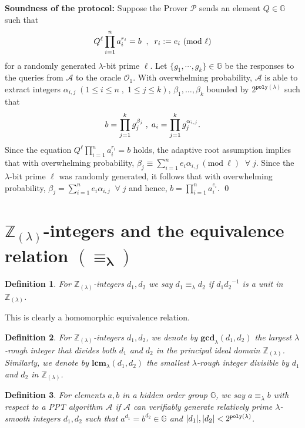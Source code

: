\documentclass[11pt, lettersize, notitlepage, leqno, footskip=0.6cm]{article}
\newcommand{\bz}{\mathbb Z}
\newcommand{\pl}{\prod\limits}
\newcommand{\slim}{\sum\limits}
\newcommand{\ttt}{\texttt}
\newcommand{\bG}{\mathbb{G}}
\newcommand{\LRA}{\Longleftrightarrow}
\newcommand{\eqlam}{\equiv_{\lam}}
\newcommand{\wti}{\widetilde}
\newcommand{\mc}{\mathcal}
\newcommand{\mb}{\mathbb}
\newcommand{\mbf}{\mathbf}
\newcommand{\al}{\alpha}
\newcommand{\be}{\beta}
\newcommand{\lam}{\lambda}
\newcommand{\lamb}{\lambda}
\newcommand{\bzlam}{\bz_{(\lam)}}
\newcommand{\mP}{\mc{P}}
\newcommand{\A}{\mc{A}}
\newcommand{\vs}{\vspace{-0.15cm}}
\newcommand{\noin}{\noindent}
\newcommand{\op}{overwhelming probability}
\newcommand{\Mod}[1]{\ (\mathrm{mod}\ #1)}
\newcommand{\LCM}{\mbf{lcm}}
\newcommand{\GCD}{\mbf{gcd}}
\newtheorem{Def}{Definition}[section]
\numberwithin{equation}{section}
\begin{document}
{{{\noin \textbf{Soundness of the protocol:} Suppose the Prover $\mP$ sends an element $Q\in\bG$ such that \vs $$Q^{\ell}\pl_{i=1}^n a_i^{r_i} = b\;\;,\;\;r_i:= e_i\Mod{\ell}\vs $$ for a randomly generated $\lam$-bit prime $\ell$. Let $\{g_1,\cdots,g_k\}\in \bG$ be the responses to the queries from $\A$ to the oracle $\mc{O}_1$. With \op, $\A$ is able to extract integers $\al_{i,j}\; (1\leq i \leq n\;,\;1\leq j \leq k)$, $\be_1,\dots, \be_k$ bounded by $2^{\ttt{poly}(\lam)}$ such that \vs $$b = \pl_{j=1}^k g_j^{\be_j}\;,\;a_i = \pl_{j=1}^k g_j^{\al_{i,j}}. \vspace{-0.25cm} $$ Since the equation $Q^{\ell}\prod_{i=1}^n a_i^{r_i} = b $ holds, the adaptive root assumption implies that with \op, $\be_j\equiv \sum_{i=1}^n e_i\al_{i, j}\Mod{\ell}\;\;\forall\; j.$ Since the $\lam$-bit prime $\ell$ was randomly generated, it follows that with \op, $ \be_j = \slim_{i=1}^n e_i\al_{i, j}\;\;\forall\; j$ and hence, $b = \prod_{i=1}^n a_i^{e_i}$. \qed

\section{\fontsize{11}{11}\selectfont $\bz_{(\lamb)}$-integers and the equivalence relation $\mathbf{(\equiv_{\lam})}$}


\begin{Def} For $\bzlam$-integers $d_1,d_2$ we say $d_1\eqlam d_2$ if ${d_1}{d_2}^{-1}$ is a unit in $\bzlam$.\end{Def}

\noin \hypertarget{shortcut}{This is clearly a homomorphic equivalence relation}.

\begin{Def} For $\bzlam$-integers $d_1,d_2$, we denote by $\GCD_{\lam}(d_1,d_2)$ the largest $\lam$-rough integer that divides both $d_1$ and $d_2$ in the principal ideal domain $\bzlam$. Similarly, we denote by $\LCM_{\lam}(d_1,d_2)$ the smallest $\lam$-rough integer divisible by $d_1$ and $d_2$ in $\bzlam$.\end{Def}


\begin{Def} For elements $a, b$ in a hidden order group $\mb{G}$, we say $ a \equiv_{\lam} b$ with respect to a PPT algorithm $\A$ if $\mc{A}$ can verifiably generate relatively prime $\lamb$-smooth integers $d_1, d_2$ such that $a^{d_1} = b^{d_2} \in \bG$ and $|d_1|,|d_2| < 2^{\tt{poly}(\lam)}$. \end{Def}

}}}
\end{document}
